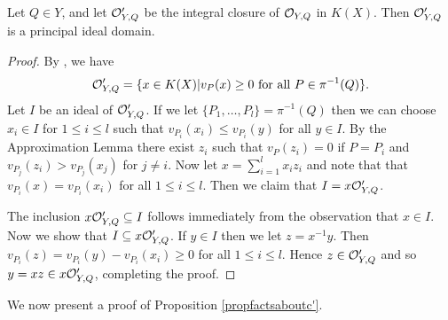 
    \begin{lem}\label{lemmapidlemma}
    Let $Q\in Y$, and let ${\cal O}_{Y,Q}'$ be the integral closure of ${\cal O}_{Y,Q}$ in $K(X)$.
    Then ${\cal O}_{Y,Q}'$ is a principal ideal domain.
    \end{lem}
    \begin{proof}
    By \cite[Cor. 3.3.5]{stichtenoth}, we have 
        \[
        \cO_{Y,Q}' = \{x\in K(X)|v_P(x) \geq 0 \ \text{for all} \ P\in \pi^{-1}(Q)\}.
        \]  
    Let $I$ be an ideal of ${\cal O}_{Y,Q}'$.
    If we let $\{P_1,\ldots, P_l\} = \pi^{-1}(Q)$ then we can choose $x_i \in I$ for $1\leq i \leq l$ such that $v_{P_i}(x_i) \leq v_{P_i}(y)$ for all $y\in I$.
    By the Approximation Lemma there exist $z_i$ such that $v_P (z_i) = 0$ if $P=P_i$ and $v_{P_j}(z_i) > v_{P_j}(x_j)$ for $j\neq i$.
    Now let $x = \sum_{i=1}^l x_iz_i$ and note that that $v_{P_i}(x) = v_{P_i}(x_i)$ for all $1\leq i\leq l$.
    Then we claim that $I = x {\cal O}_{Y,Q}'$.


    The inclusion $x{\cal O}_{Y,Q}' \subseteq I$ follows immediately from the observation that $x \in I$.
    Now we show that $I \subseteq x{\cal O}_{Y,Q}'$.
    If $y\in I$ then we let $z = x^{-1}y$.
    Then $v_{P_i}(z) = v_{P_i}(y) - v_{P_i}(x_i) \geq 0$ for all $1\leq i\leq l$.
    Hence $z\in {\cal O}_{Y,Q}'$ and so $y = xz \in x{\cal O}_{Y,Q}'$, completing the proof.
    \end{proof}

We now present a proof of Proposition \ref{propfactsaboutc'}.

